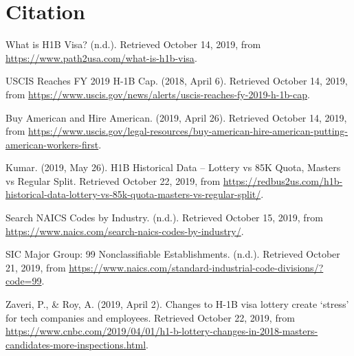 \documentclass[]{article}
\begin{document}
\hypertarget{citation}{%
\section{Citation}\label{citation}}

What is H1B Visa? (n.d.). Retrieved October 14, 2019, from
\url{https://www.path2usa.com/what-is-h1b-visa}.

USCIS Reaches FY 2019 H-1B Cap. (2018, April 6). Retrieved October 14,
2019, from
\url{https://www.uscis.gov/news/alerts/uscis-reaches-fy-2019-h-1b-cap}.

Buy American and Hire American. (2019, April 26). Retrieved October 14,
2019, from
\url{https://www.uscis.gov/legal-resources/buy-american-hire-american-putting-american-workers-first}.

Kumar. (2019, May 26). H1B Historical Data -- Lottery vs 85K Quota,
Masters vs Regular Split. Retrieved October 22, 2019, from
\url{https://redbus2us.com/h1b-historical-data-lottery-vs-85k-quota-masters-vs-regular-split/}.

Search NAICS Codes by Industry. (n.d.). Retrieved October 15, 2019, from
\url{https://www.naics.com/search-naics-codes-by-industry/}.

SIC Major Group: 99 Nonclassifiable Establishments. (n.d.). Retrieved
October 21, 2019, from
\url{https://www.naics.com/standard-industrial-code-divisions/?code=99}.

Zaveri, P., \& Roy, A. (2019, April 2). Changes to H-1B visa lottery
create `stress' for tech companies and employees. Retrieved October 22,
2019, from
\url{https://www.cnbc.com/2019/04/01/h1-b-lottery-changes-in-2018-masters-candidates-more-inspections.html}.
\end{document}
